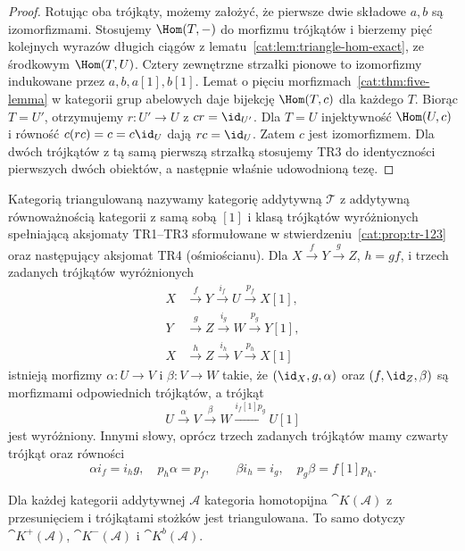 \begin{proof}
Rotując oba trójkąty, możemy założyć, że pierwsze dwie składowe $a,b$ są izomorfizmami. Stosujemy $\Hom(T,-)$ do morfizmu trójkątów i bierzemy pięć kolejnych wyrazów długich ciągów z lematu~\ref{cat:lem:triangle-hom-exact}, ze środkowym $\Hom(T,U)$. Cztery zewnętrzne strzałki pionowe to izomorfizmy indukowane przez $a,b,a[1],b[1]$. Lemat o pięciu morfizmach~\ref{cat:thm:five-lemma} w kategorii grup abelowych daje bijekcję $\Hom(T,c)$ dla każdego $T$. Biorąc $T=U'$, otrzymujemy $r:U'\to U$ z $cr=\id_{U'}$. Dla $T=U$ injektywność $\Hom(U,c)$ i równość $c(rc)=c=c\id_U$ dają $rc=\id_U$. Zatem $c$ jest izomorfizmem. Dla dwóch trójkątów z tą samą pierwszą strzałką stosujemy TR3 do identyczności pierwszych dwóch obiektów, a następnie właśnie udowodnioną tezę.
\end{proof}
\begin{definicja}\label{cat:def:triangulated-category}
Kategorią triangulowaną nazywamy kategorię addytywną $\mathcal T$ z addytywną równoważnością kategorii z samą sobą $[1]$ i klasą trójkątów wyróżnionych spełniającą aksjomaty TR1--TR3 sformułowane w stwierdzeniu~\ref{cat:prop:tr-123} oraz następujący aksjomat TR4 (ośmiościanu). Dla $X\xrightarrow f Y\xrightarrow g Z$, $h=gf$, i trzech zadanych trójkątów wyróżnionych
\[
\begin{aligned}
 X&\xrightarrow f Y\xrightarrow{i_f}U\xrightarrow{p_f}X[1],\\
 Y&\xrightarrow g Z\xrightarrow{i_g}W\xrightarrow{p_g}Y[1],\\
 X&\xrightarrow h Z\xrightarrow{i_h}V\xrightarrow{p_h}X[1]
\end{aligned}
\]
istnieją morfizmy $\alpha:U\to V$ i $\beta:V\to W$ takie, że $(\id_X,g,\alpha)$ oraz $(f,\id_Z,\beta)$ są morfizmami odpowiednich trójkątów, a trójkąt
\begin{equation}\label{cat:eq:octahedron}
 U\xrightarrow{\alpha}V\xrightarrow{\beta}W
 \xrightarrow{i_f[1]p_g}U[1]
\end{equation}
jest wyróżniony. Innymi słowy, oprócz trzech zadanych trójkątów mamy czwarty trójkąt oraz równości
\[
 \alpha i_f=i_hg,\quad p_h\alpha=p_f,\qquad
 \beta i_h=i_g,\quad p_g\beta=f[1]p_h.
\]
\end{definicja}
\begin{twierdzenie}\label{cat:thm:homotopy-triangulated}
Dla każdej kategorii addytywnej $\mathcal A$ kategoria homotopijna $\cat K(\mathcal A)$ z przesunięciem i trójkątami stożków jest triangulowana. To samo dotyczy $\cat K^+(\mathcal A)$, $\cat K^-(\mathcal A)$ i $\cat K^b(\mathcal A)$.
\end{twierdzenie}
